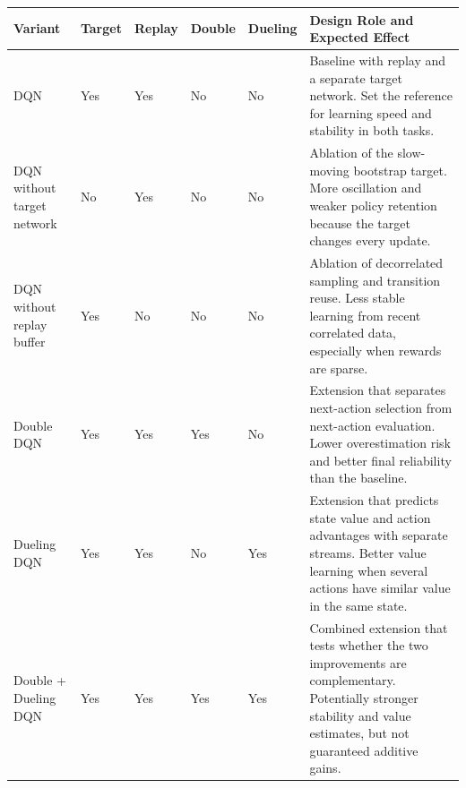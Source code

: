 \begin{tabularx}{\textwidth}{@{}>{\raggedright\arraybackslash}p{}>{\centering\arraybackslash}p{}>{\centering\arraybackslash}p{}>{\centering\arraybackslash}p{}>{\centering\arraybackslash}p{}Y@{}}
\toprule
\textbf{Variant} & \textbf{Target} & \textbf{Replay} & \textbf{Double} & \textbf{Dueling} & \textbf{Design Role and Expected Effect} \\
\midrule
DQN & Yes & Yes & No & No & Baseline with replay and a separate target network. Set the reference for learning speed and stability in both tasks. \\
DQN without target network & No & Yes & No & No & Ablation of the slow-moving bootstrap target. More oscillation and weaker policy retention because the target changes every update. \\
DQN without replay buffer & Yes & No & No & No & Ablation of decorrelated sampling and transition reuse. Less stable learning from recent correlated data, especially when rewards are sparse. \\
Double DQN & Yes & Yes & Yes & No & Extension that separates next-action selection from next-action evaluation. Lower overestimation risk and better final reliability than the baseline. \\
Dueling DQN & Yes & Yes & No & Yes & Extension that predicts state value and action advantages with separate streams. Better value learning when several actions have similar value in the same state. \\
Double + Dueling DQN & Yes & Yes & Yes & Yes & Combined extension that tests whether the two improvements are complementary. Potentially stronger stability and value estimates, but not guaranteed additive gains. \\
\bottomrule
\end{tabularx}
